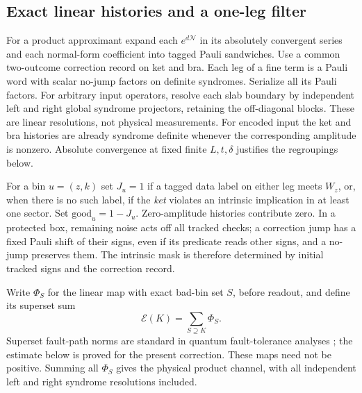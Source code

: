 \subsection{Exact linear histories and a one-leg filter}

For a product approximant expand each \(e^{d\mathcal N}\)
in its absolutely convergent series and each normal-form
coefficient into tagged Pauli sandwiches. Use a common
two-outcome correction record on ket and bra.
Each leg of a fine term is a Pauli word with scalar
no-jump factors on definite syndromes. Serialize all its
Pauli factors. For arbitrary input operators, resolve each
slab boundary by independent left and right global syndrome
projectors, retaining the off-diagonal blocks. These are
linear resolutions, not physical measurements.
For encoded input the ket and bra histories are already
syndrome definite whenever the corresponding amplitude is
nonzero. Absolute convergence at fixed finite \(L,t,\delta\)
justifies the regroupings below.

For a bin \(u=(z,k)\) set \(J_u=1\) if a tagged data label on
either leg meets \(W_z\), or, when there is no such label,
if the \emph{ket} violates an intrinsic implication in at
least one sector. Set \(\mathrm{good}_u=1-J_u\).
Zero-amplitude histories contribute zero.
In a protected box, remaining noise acts off all tracked
checks; a correction jump has a fixed Pauli shift of their
signs, even if its predicate reads other signs, and a no-jump
preserves them. The intrinsic mask is therefore determined
by initial tracked signs and the correction record.

Write \(\Phi_S\) for the linear map with exact bad-bin set
\(S\), before readout, and define its superset sum
\begin{equation}\label{eq:coherent-superset}
 \mathcal E(K)=\sum_{S\supseteq K}\Phi_S .
\end{equation}
Superset fault-path norms are standard in quantum fault-tolerance
analyses \cite{AGP,DST}; the estimate below is proved for the
present correction.
These maps need not be positive. Summing all \(\Phi_S\)
gives the physical product channel, with all independent
left and right syndrome resolutions included.

